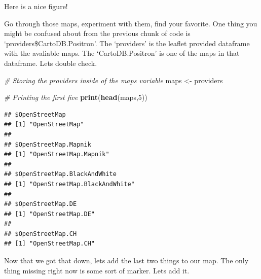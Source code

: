 \documentclass[]{book}
\newenvironment{Shaded}{\begin{snugshade}}{\end{snugshade}}
\newcommand{\CommentTok}[1]{\textcolor[rgb]{0.56,0.35,0.01}{\textit{#1}}}
\newcommand{\DataTypeTok}[1]{\textcolor[rgb]{0.13,0.29,0.53}{#1}}
\newcommand{\DecValTok}[1]{\textcolor[rgb]{0.00,0.00,0.81}{#1}}
\newcommand{\FloatTok}[1]{\textcolor[rgb]{0.00,0.00,0.81}{#1}}
\newcommand{\KeywordTok}[1]{\textcolor[rgb]{0.13,0.29,0.53}{\textbf{#1}}}
\newcommand{\NormalTok}[1]{#1}
\newcommand{\OperatorTok}[1]{\textcolor[rgb]{0.81,0.36,0.00}{\textbf{#1}}}
\newcommand{\StringTok}[1]{\textcolor[rgb]{0.31,0.60,0.02}{#1}}
\begin{document}
\begin{Shaded}
\end{Shaded}

\hypertarget{htmlwidget-dff245d014b6bd21e693}{}

\label{fig:nice-fig75}Here is a nice figure!

Go through those maps, experiment with them, find your favorite. One thing you might be confused about from the previous chunk of code is `providers\$CartoDB.Positron'. The `providers' is the leaflet provided dataframe with the avaliable maps. The `CartoDB.Positron' is one of the maps in that dataframe. Lets double check.

\begin{Shaded}
\begin{Highlighting}[]
\CommentTok{# Storing the providers inside of the maps variable }
\NormalTok{maps <-}\StringTok{ }\NormalTok{providers}

\CommentTok{# Printing the first five}
\KeywordTok{print}\NormalTok{(}\KeywordTok{head}\NormalTok{(maps,}\DecValTok{5}\NormalTok{))}
\end{Highlighting}
\end{Shaded}

\begin{verbatim}
## $OpenStreetMap
## [1] "OpenStreetMap"
## 
## $OpenStreetMap.Mapnik
## [1] "OpenStreetMap.Mapnik"
## 
## $OpenStreetMap.BlackAndWhite
## [1] "OpenStreetMap.BlackAndWhite"
## 
## $OpenStreetMap.DE
## [1] "OpenStreetMap.DE"
## 
## $OpenStreetMap.CH
## [1] "OpenStreetMap.CH"
\end{verbatim}

Now that we got that down, lets add the last two things to our map. The only thing missing right now is some sort of marker. Lets add it.
\end{document}
